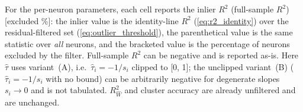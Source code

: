 For the per-neuron parameters, each cell reports the inlier $R^2$ (full-sample $R^2$) [excluded \%]: the inlier value is the identity-line $R^2$ (\cref{eq:r2_identity}) over the residual-filtered set (\cref{eq:outlier_threshold}), the parenthetical value is the same statistic over \emph{all} neurons, and the bracketed value is the percentage of neurons excluded by the filter. Full-sample $R^2$ can be negative and is reported as-is. Here $\hat{\tau}$ uses variant~(A), i.e.\ $\hat{\tau}_i=-1/s_i$ clipped to [0, 1]; the unclipped variant~(B) ($\hat{\tau}_i=-1/s_i$ with no bound) can be arbitrarily negative for degenerate slopes $s_i\to 0$ and is not tabulated. $R^2_{\hat{W}}$ and cluster accuracy are already unfiltered and are unchanged.
